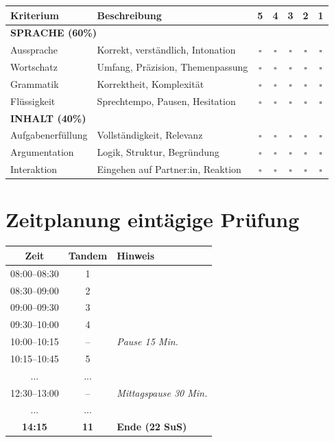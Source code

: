 \documentclass[11pt,a4paper]{article}
\newcommand{\checkbox}{$\square$}
\begin{document}
\begin{center}
\small
\begin{tabularx}{\textwidth}{|l|X|c|c|c|c|c|}
\hline
\rowcolor{lightblue}
\textbf{Kriterium} & \textbf{Beschreibung} & \textbf{5} & \textbf{4} & \textbf{3} & \textbf{2} & \textbf{1} \\
\hline
\multicolumn{7}{|l|}{\textbf{SPRACHE (60\%)}} \\
\hline
Aussprache & Korrekt, verständlich, Intonation & \checkbox & \checkbox & \checkbox & \checkbox & \checkbox \\
\hline
Wortschatz & Umfang, Präzision, Themenpassung & \checkbox & \checkbox & \checkbox & \checkbox & \checkbox \\
\hline
Grammatik & Korrektheit, Komplexität & \checkbox & \checkbox & \checkbox & \checkbox & \checkbox \\
\hline
Flüssigkeit & Sprechtempo, Pausen, Hesitation & \checkbox & \checkbox & \checkbox & \checkbox & \checkbox \\
\hline
\multicolumn{7}{|l|}{\textbf{INHALT (40\%)}} \\
\hline
Aufgabenerfüllung & Vollständigkeit, Relevanz & \checkbox & \checkbox & \checkbox & \checkbox & \checkbox \\
\hline
Argumentation & Logik, Struktur, Begründung & \checkbox & \checkbox & \checkbox & \checkbox & \checkbox \\
\hline
Interaktion & Eingehen auf Partner:in, Reaktion & \checkbox & \checkbox & \checkbox & \checkbox & \checkbox \\
\hline
\end{tabularx}
\end{center}

\section{Zeitplanung eintägige Prüfung}

\begin{center}
\begin{tabular}{c|c|l}
\rowcolor{lightblue}
\textbf{Zeit} & \textbf{Tandem} & \textbf{Hinweis} \\
\hline
08:00--08:30 & 1 & \\
08:30--09:00 & 2 & \\
09:00--09:30 & 3 & \\
09:30--10:00 & 4 & \\
\rowcolor{accentorange!20}
10:00--10:15 & -- & \textit{Pause 15 Min.} \\
10:15--10:45 & 5 & \\
... & ... & \\
\rowcolor{accentorange!20}
12:30--13:00 & -- & \textit{Mittagspause 30 Min.} \\
... & ... & \\
\textbf{14:15} & \textbf{11} & \textbf{Ende (22 SuS)} \\
\hline
\end{tabular}
\end{center}
\end{document}
